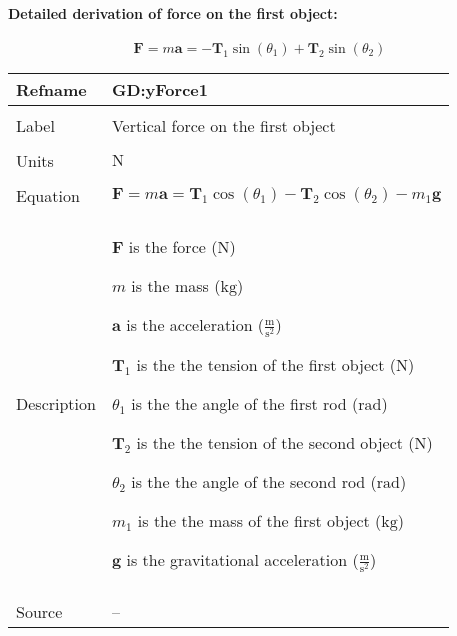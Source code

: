 \documentclass[12pt]{article}
\begin{document}
\paragraph{Detailed derivation of force on the first object:}
\label{GD:xForce1Deriv}
\begin{displaymath}
\symbf{F}=m \symbf{a}=-{\symbf{T}_{1}} \sin\left({θ_{1}}\right)+{\symbf{T}_{2}} \sin\left({θ_{2}}\right)
\end{displaymath}
\vspace{\baselineskip}
\noindent
\begin{minipage}{\textwidth}
\begin{tabular}{>{\raggedright}p{}>{\raggedright\arraybackslash}p{}}
\toprule \textbf{Refname} & \textbf{GD:yForce1}
\label{GD:yForce1}
\\ \midrule \\
Label & Vertical force on the first object
        
\\ \midrule \\
Units & ${\text{N}}$
        
\\ \midrule \\
Equation & \begin{displaymath}
           \symbf{F}=m \symbf{a}={\symbf{T}_{1}} \cos\left({θ_{1}}\right)-{\symbf{T}_{2}} \cos\left({θ_{2}}\right)-{m_{1}} \symbf{g}
           \end{displaymath}
\\ \midrule \\
Description & \begin{symbDescription}
              \item{$\symbf{F}$ is the force (${\text{N}}$)}
              \item{$m$ is the mass (${\text{kg}}$)}
              \item{$\symbf{a}$ is the acceleration ($\frac{\text{m}}{\text{s}^{2}}$)}
              \item{${\symbf{T}_{1}}$ is the the tension of the first object (${\text{N}}$)}
              \item{${θ_{1}}$ is the the angle of the first rod (${\text{rad}}$)}
              \item{${\symbf{T}_{2}}$ is the the tension of the second object (${\text{N}}$)}
              \item{${θ_{2}}$ is the the angle of the second rod (${\text{rad}}$)}
              \item{${m_{1}}$ is the the mass of the first object (${\text{kg}}$)}
              \item{$\symbf{g}$ is the gravitational acceleration ($\frac{\text{m}}{\text{s}^{2}}$)}
              \end{symbDescription}
\\ \midrule \\
Source & --
         

\end{tabular}
\end{minipage}
\end{document}

